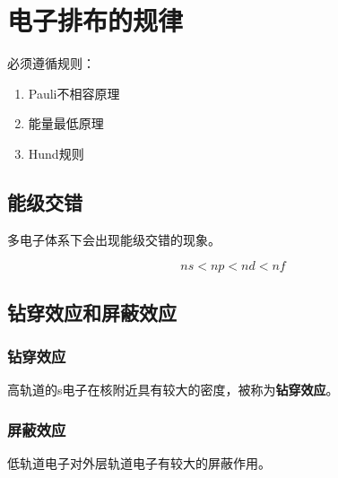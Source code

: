 

\section{电子排布的规律}

必须遵循规则：

\begin{enumerate}
	\item Pauli不相容原理
	\item 能量最低原理
	\item Hund规则
\end{enumerate}

\subsection{能级交错}

多电子体系下会出现能级交错的现象。

\begin{equation*}
	ns < np < nd < nf
\end{equation*}

\subsection{钻穿效应和屏蔽效应}

\subsubsection{钻穿效应}

高轨道的s电子在核附近具有较大的密度，被称为\textbf{钻穿效应}。

\subsubsection{屏蔽效应}

低轨道电子对外层轨道电子有较大的屏蔽作用。

